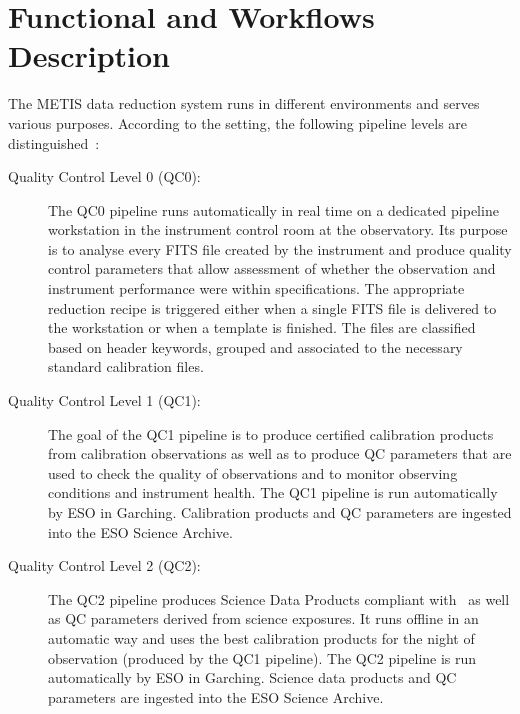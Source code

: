 \section{Functional and Workflows Description}
\label{sec:data_processing_overview}

The METIS data reduction system runs in different environments and
serves various purposes.  According to the setting, the following
pipeline levels are distinguished~\cite{1618}:

\begin{description}
\item[Quality Control Level 0 (QC0):] The QC0 pipeline runs
  automatically in real time on a dedicated pipeline workstation in
  the instrument control room at the observatory. Its purpose is to
  analyse every FITS file created by the instrument and produce
  quality control parameters that allow assessment of whether the
  observation and instrument performance were within specifications.
  The appropriate reduction recipe is triggered either when a single
  FITS file is delivered to the workstation or when a template is
  finished. The files are classified based on header keywords, grouped
  and associated to the necessary standard calibration files.

\item[Quality Control Level 1 (QC1):] The goal of the QC1 pipeline is
  to produce certified calibration products from calibration
  observations as well as to produce QC parameters that are used to
  check the quality of observations and to monitor observing
  conditions and instrument health.
  The QC1 pipeline is run automatically by ESO in Garching.
  Calibration products and QC parameters are ingested into the ESO Science Archive.

\item[Quality Control Level 2 (QC2):] The QC2 pipeline produces
  Science Data Products compliant with~\cite{ESO-products_standard} as
  well as QC parameters derived from science exposures. It runs
  offline in an automatic way and uses the best calibration products
  for the night of observation (produced by the QC1 pipeline).
  The QC2 pipeline is run automatically by ESO in Garching.
  Science data products and QC parameters are ingested into the ESO Science Archive.


\end{description}
